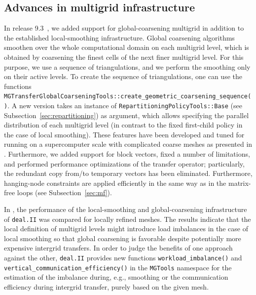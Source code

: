 \documentclass{ansarticle-preprint}
\newcommand{\specialword}[1]{\texttt{#1}}
\newcommand{\dealii}{{\specialword{deal.II}}\xspace}
\begin{document}
\subsection{Advances in multigrid infrastructure}\label{sec:multigrid}

In release 9.3~\cite{dealII93}, we added support for global-coarsening multigrid in
addition to the established local-smoothing infrastructure. Global
coarsening algorithms smoothen over the whole computational domain on each
multigrid level, which is obtained by coarsening the finest cells of
the next finer multigrid level.
For this purpose, we use a sequence of triangulations, and we perform
the smoothing only on their active levels. To create the sequence of
triangulations, one can use the functions \texttt{MGTransferGlobalCoarseningTools::create\_geometric\_coarsening\_sequence()}. A new version takes an
instance of \texttt{RepartitioningPolicyTools::Base} (see Subsection~\ref{sec:repartitioning}) as argument, which allows specifying the parallel
distribution of each multigrid level (in contrast to the fixed first-child policy in the case of local smoothing). These features have been developed and tuned for running on a supercomputer scale
with complicated coarse meshes as presented in \cite{kronbichler2021next}.
Furthermore, we added support for block vectors,
fixed a number of limitations, and performed performance optimizations of
the transfer operator; particularly, the redundant copy from/to temporary vectors
has been eliminated. Furthermore, hanging-node constraints are applied
efficiently in the same way as in the matrix-free loops (see Subsection~\ref{sec:mf}).

In \cite{munch2022gc}, the performance of the local-smoothing and global-coarsening
infrastructure of \dealii{} was compared for locally refined meshes. The results indicate that
the local definition of multigrid levels might introduce load imbalances
in the case of local smoothing so that global coarsening is favorable despite
potentially more expensive intergrid transfers. In order to judge the benefits
of one approach against the other, \dealii{} provides new functions
\texttt{workload\_imbalance()} and \texttt{vertical\_communication\_efficiency()}
in the \texttt{MGTools} namespace for the  estimation of the imbalance during, e.g.,
smoothing or the
communication efficiency during intergrid transfer, purely based on the given mesh.
\end{document}
